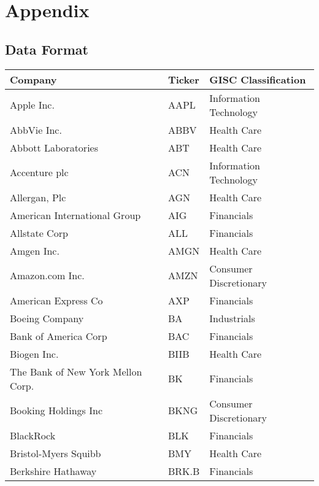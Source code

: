 \chapter{Appendix}

\section{Data Format}\label{selectedsecurities}
\begin{table}[p]
\centering
\begin{tabular}{@{}lll@{}}
\toprule\toprule
Company & Ticker & GISC Classification \\ \midrule
Apple Inc.                        & AAPL  & Information Technology \\ 
AbbVie Inc.                       & ABBV  & Health Care            \\
Abbott Laboratories               & ABT   & Health Care            \\
Accenture plc                     & ACN   & Information Technology \\
Allergan, Plc                     & AGN   & Health Care            \\
American International Group      & AIG   & Financials             \\
Allstate Corp                     & ALL   & Financials             \\
Amgen Inc.                        & AMGN  & Health Care            \\
Amazon.com Inc.                   & AMZN  & Consumer Discretionary \\
American Express Co               & AXP   & Financials             \\
Boeing Company                    & BA    & Industrials            \\
Bank of America Corp              & BAC   & Financials             \\
Biogen Inc.                       & BIIB  & Health Care            \\
The Bank of New York Mellon Corp. & BK    & Financials             \\
Booking Holdings Inc              & BKNG  & Consumer Discretionary \\
BlackRock                         & BLK   & Financials             \\
Bristol-Myers Squibb              & BMY   & Health Care            \\
Berkshire Hathaway                & BRK.B & Financials             \\

\end{tabular}
\end{table}
